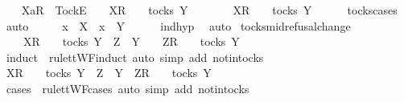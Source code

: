 \begin{isabellebody}
\ \ \isamarkupfalse%
\ {\isachardoublequoteopen}{\isacharbrackleft}Xa{\isacharbrackright}\isactrlsub R\ {\isacharhash}\ {\isacharbrackleft}Tock{\isacharbrackright}\isactrlsub E\ {\isacharhash}\ {\isasymsigma}{\isacharprime}\ {\isacharat}\ {\isacharbrackleft}X{\isacharbrackright}\isactrlsub R\ {\isacharhash}\ {\isasymsigma}\ {\isasymin}\ tocks\ Y{\isachardoublequoteclose}\isanewline
\ \ \isamarkupfalse%
\ \isamarkupfalse%
\ {\isachardoublequoteopen}{\isasymsigma}{\isacharprime}\ {\isacharat}\ {\isacharbrackleft}X{\isacharbrackright}\isactrlsub R\ {\isacharhash}\ {\isasymsigma}\ {\isasymin}\ tocks\ Y{\isachardoublequoteclose}\isanewline
\ \ \ \ \isamarkupfalse%
\ tocks{\isachardot}cases\ \isamarkupfalse%
\ auto\isanewline
\ \ \isamarkupfalse%
\ \isamarkupfalse%
\ {\isachardoublequoteopen}x\ {\isasymin}\ X\ {\isasymLongrightarrow}\ x\ {\isasymin}\ Y{\isachardoublequoteclose}\isanewline
\ \ \ \ \isamarkupfalse%
\ ind{\isacharunderscore}hyp\ \isamarkupfalse%
\ auto\isanewline
{}\isamarkupfalse%
%
\endisatagproof
{\isafoldproof}%
%
\isadelimproof
\isanewline
%
\endisadelimproof
\isanewline
{}\isamarkupfalse%
\ tocks{\isacharunderscore}mid{\isacharunderscore}refusal{\isacharunderscore}change{\isacharcolon}\isanewline
\ \ {\isachardoublequoteopen}{\isasymrho}\ {\isacharat}\ {\isacharbrackleft}X{\isacharbrackright}\isactrlsub R\ {\isacharhash}\ {\isasymsigma}\ {\isasymin}\ tocks\ Y\ {\isasymLongrightarrow}\ Z\ {\isasymsubseteq}\ Y\ {\isasymLongrightarrow}\ {\isasymrho}\ {\isacharat}\ {\isacharbrackleft}Z{\isacharbrackright}\isactrlsub R\ {\isacharhash}\ {\isasymsigma}\ {\isasymin}\ tocks\ Y{\isachardoublequoteclose}\isanewline
%
\isadelimproof
%
\endisadelimproof
%
\isatagproof
{}\isamarkupfalse%
\ {\isacharparenleft}induct\ {\isasymrho}\ rule{\isacharcolon}ttWF{\isachardot}induct{\isacharcomma}\ auto\ simp\ add{\isacharcolon}\ notin{\isacharunderscore}tocks{\isacharparenright}\isanewline
\ \ \isamarkupfalse%
\ {\isachardoublequoteopen}{\isacharbrackleft}X{\isacharbrackright}\isactrlsub R\ {\isacharhash}\ {\isasymsigma}\ {\isasymin}\ tocks\ Y\ {\isasymLongrightarrow}\ Z\ {\isasymsubseteq}\ Y\ {\isasymLongrightarrow}\ {\isacharbrackleft}Z{\isacharbrackright}\isactrlsub R\ {\isacharhash}\ {\isasymsigma}\ {\isasymin}\ tocks\ Y{\isachardoublequoteclose}\isanewline
\ \ \isamarkupfalse%
\ {\isacharparenleft}cases\ {\isasymsigma}\ rule{\isacharcolon}ttWF{\isachardot}cases{\isacharcomma}\ auto\ simp\ add{\isacharcolon}\ notin{\isacharunderscore}tocks{\isacharparenright}\isanewline

\end{isabellebody}
